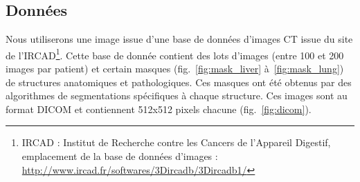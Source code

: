 \subsection{Données}
		Nous utiliserons une image issue d'une base de données d'images CT issue du site de l'IRCAD\footnote{IRCAD : Institut de Recherche contre les Cancers de l'Appareil Digestif, emplacement de la base de données d'images : \url{http://www.ircad.fr/softwares/3Dircadb/3Dircadb1/}}. Cette base de donnée contient des lots d'images (entre 100 et 200 images par patient) et certain masques (fig.~\ref{fig:mask_liver} à~\ref{fig:mask_lung}) de structures anatomiques et pathologiques. Ces masques ont été obtenus par des algorithmes de segmentations spécifiques à chaque structure. Ces images sont au format DICOM \citep{Chabriais2004,Mildenberger2002} et contiennent 512x512 pixels chacune (fig.~\ref{fig:dicom}). %
		

